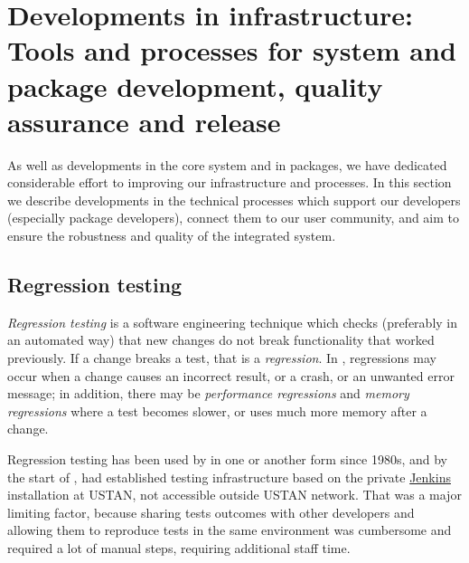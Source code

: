 \section{Developments in \GAP infrastructure: Tools and processes for
  system and package development, quality assurance and release }\label{sec:gap-infra}

As well as developments in the core system and in packages, we have
dedicated considerable effort to improving our infrastructure and processes. 
In this section we describe developments in the technical processes
which support our developers (especially package developers),
connect them to our user community, and aim to 
ensure the robustness and quality of the integrated system.


\subsection{Regression testing}\label{testing}

\emph{Regression testing} is a software engineering technique which
checks (preferably in an automated way)
that new changes do not break functionality that 
worked previously. If a change breaks a test, that is 
a \emph{regression}. In \GAP, regressions may occur
when a change causes an incorrect result, or a crash, or an unwanted error
message; in addition, there may be \emph{performance regressions}
and \emph{memory regressions} where a test becomes slower, or uses
much more memory after a change.

Regression testing has been used by \GAP in one or another form since 
1980s, and by the start of \ODK, \GAP had established testing infrastructure
based on the private \href{https://jenkins.io/}{\sf Jenkins} installation
at USTAN, not accessible outside USTAN network. That was a major limiting
factor, because sharing tests outcomes with other developers and
allowing them to reproduce tests in the same environment was cumbersome
and required a lot of manual steps, requiring additional staff time.


